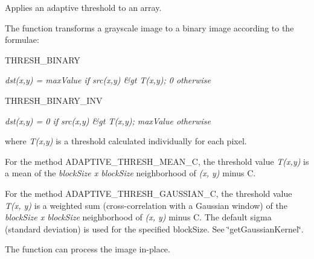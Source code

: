 Applies an adaptive threshold to an array.

The function transforms a grayscale image to a binary image according to the formulae\+:


\begin{DoxyItemize}
\item T\+H\+R\+E\+S\+H\+\_\+\+B\+I\+N\+A\+RY 
\end{DoxyItemize}

{\itshape dst(x,y) = max\+Value if src(x,y) \&gt T(x,y); 0 otherwise}


\begin{DoxyItemize}
\item T\+H\+R\+E\+S\+H\+\_\+\+B\+I\+N\+A\+R\+Y\+\_\+\+I\+NV 
\end{DoxyItemize}

{\itshape dst(x,y) = 0 if src(x,y) \&gt T(x,y); max\+Value otherwise}

where {\itshape T(x,y)} is a threshold calculated individually for each pixel.


\begin{DoxyItemize}
\item For the method {\ttfamily A\+D\+A\+P\+T\+I\+V\+E\+\_\+\+T\+H\+R\+E\+S\+H\+\_\+\+M\+E\+A\+N\+\_\+C}, the threshold value {\itshape T(x,y)} is a mean of the {\itshape block\+Size x block\+Size} neighborhood of {\itshape (x, y)} minus {\ttfamily C}. 
\item For the method {\ttfamily A\+D\+A\+P\+T\+I\+V\+E\+\_\+\+T\+H\+R\+E\+S\+H\+\_\+\+G\+A\+U\+S\+S\+I\+A\+N\+\_\+C}, the threshold value {\itshape T(x, y)} is a weighted sum (cross-\/correlation with a Gaussian window) of the {\itshape block\+Size x block\+Size} neighborhood of {\itshape (x, y)} minus {\ttfamily C}. The default sigma (standard deviation) is used for the specified {\ttfamily block\+Size}. See \char`\"{}get\+Gaussian\+Kernel\char`\"{}. 
\end{DoxyItemize}

The function can process the image in-\/place.


